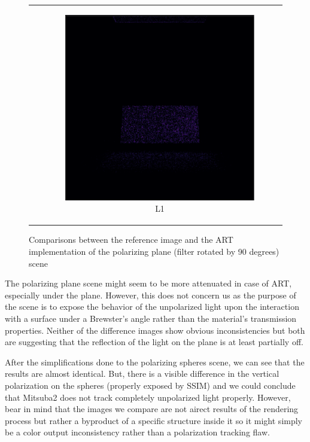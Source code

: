 \begin{figure}[h]
\begin{tabular}{cc}
\begin{subfigure}
			\caption{SSIM}
		\end{subfigure} 
		&
		\begin{subfigure}
			{0.4\textwidth}\centering\includegraphics[width=\linewidth]{img/polarizing_plane_90_L1.png}
			\caption{L1}
		\end{subfigure}
	\end{tabular}
	\caption{Comparisons between the reference image and the ART implementation of the polarizing plane (filter rotated by 90 degrees) scene}
	\label{fig:compare_polar_angle}
\end{figure}

The polarizing plane scene might seem to be more attenuated in case of ART, especially under the plane. However, this does not concern us as the purpose of the scene is to expose the behavior of the unpolarized light upon the interaction with a surface under a Brewster's angle rather than the material's transmission properties. Neither of the difference images show obvious inconsistencies but both are suggesting that the reflection of the light on the plane is at least partially off.

After the simplifications done to the polarizing spheres scene, we can see that the results are almost identical. But, there is  a visible difference in the vertical polarization on the spheres (properly exposed by SSIM) and we could conclude that Mitsuba2 does not track completely unpolarized light properly. However, bear in mind that the images we compare are not airect results of the rendering process but rather a byproduct of a specific structure inside it so it might simply be a color output inconsistency rather than a polarization tracking flaw.